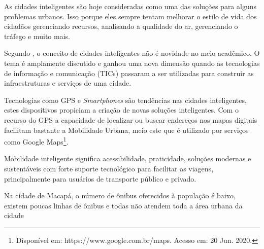 As cidades inteligentes são hoje consideradas como uma das soluções para alguns problemas urbanos. Isso porque eles sempre tentam melhorar o estilo de vida dos cidadãos gerenciando recursos, analisando a qualidade do ar, gerenciando o tráfego e muito mais. 

Segundo , o conceito de cidades inteligentes não é novidade no meio acadêmico. O tema é amplamente discutido e ganhou uma nova dimensão quando as tecnologias de informação e comunicação (TICs) passaram a ser utilizadas para construir as infraestruturas e serviços de uma cidade.

Tecnologias como GPS e \textit{Smartphones} são tendências nas cidades inteligentes, estes dispositivos propiciam a criação de novas soluções inteligentes. Com o recurso do GPS a capacidade de localizar ou buscar endereços nos mapas digitais facilitam bastante a Mobilidade Urbana, meio este que é utilizado por serviços como Google Maps\footnote{Disponível em: https://www.google.com.br/maps. Acesso em: 20 Jun. 2020.}.

Mobilidade inteligente significa acessibilidade, praticidade, soluções modernas e sustentáveis com forte suporte tecnológico para facilitar as viagens, principalmente para usuários de transporte público e privado.

Na cidade de Macapá, o número de ônibus oferecidos à população é baixo, existem poucas linhas de ônibus e todas não atendem toda a área urbana da cidade \cite{sau2018}

